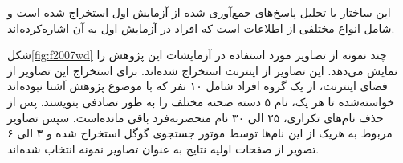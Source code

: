 \begin{enumerate}
	این ساختار با تحلیل پاسخ‌های جمع‌آوری شده از آزمایش اول استخراج شده است و شامل انواع مختلفی از اطلاعات است که افراد در آزمایش اول به آن اشاره‌کرده‌اند.
	
	
	
	
	
\end{enumerate}


شکل\ref{fig:f2007wd}
چند نمونه از تصاویر مورد استفاده در آزمایشات این پژوهش را نمایش می‌دهد. این تصاویر از اینترنت استخراج شده‌اند. برای استخراج این تصاویر از فضای اینترنت، از یک گروه افراد شامل ۱۰ نفر که با موضوع پژوهش آشنا نبوده‌اند خواسته‌شده تا هر یک، نام ۵ دسته صحنه مختلف را به طور تصادفی بنویسند. پس از حذف نام‌های تکراری، ۲۵ الی ۳۰ نام منحصربه‌فرد باقی مانده‌است. سپس تصاویر مربوط به هریک از این نام‌ها توسط موتور جستجوی گوگل استخراج شده و ۳ الی ۶ تصویر از صفحات اولیه نتایج به عنوان تصاویر نمونه انتخاب شده‌اند.

